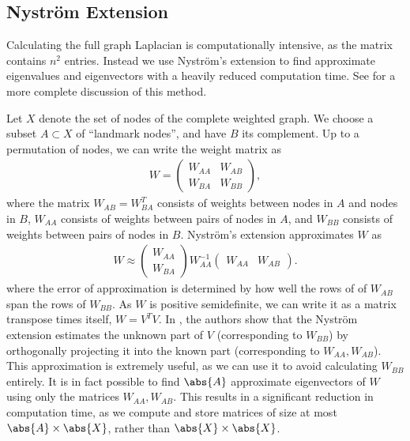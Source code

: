 \documentclass[journal]{IEEEtran}
\begin{document}
\subsection{Nystr\"{o}m Extension}\label{sec:Nystrom}
Calculating the full graph Laplacian is computationally intensive, as the matrix
contains $n^2$ entries. Instead we use Nystr\"{o}m's extension to find
approximate eigenvalues and eigenvectors with a heavily reduced computation
time. See \cite{Fowlkes04, Merkurjev13, Woodworth13} for a more complete
discussion of this method.

Let $X$ denote the set of nodes of the complete weighted graph. We choose a
subset $A\subset X$ of ``landmark nodes'', and have $B$ its complement. Up to a
permutation of nodes, we can write the weight matrix as
\begin{align}
  W = \begin{pmatrix} W_{AA} & W_{AB} \\ W_{BA} & W_{BB}
  \end{pmatrix},
\end{align}
where the matrix $W_{AB} = W_{BA}^T$ consists of weights between nodes in $A$
and nodes in $B$, $W_{AA}$ consists of weights between pairs of nodes in $A$,
and $W_{BB}$ consists of weights between pairs of nodes in $B$. Nystr\"{o}m's
extension approximates $W$ as
\begin{align}
  W \approx \begin{pmatrix} W_{AA} \\ W_{BA} \end{pmatrix}
  W_{AA}^{-1} \begin{pmatrix} W_{AA} & W_{AB}\end{pmatrix}.
\end{align}
where the error of approximation is determined by how well the rows of of
$W_{AB}$ span the rows of $W_{BB}$. As $W$ is positive semidefinite, we can
write it as a matrix transpose times itself, $W = V^TV$. In \cite{Belongie2002},
the authors show that the Nystr\"{o}m extension estimates the unknown part of
$V$ (corresponding to $W_{BB}$) by orthogonally projecting it into the known
part (corresponding to $W_{AA},W_{AB}$).  This approximation is extremely
useful, as we can use it to avoid calculating $W_{BB}$ entirely. It is in fact
possible to find $\abs{A}$ approximate eigenvectors of $W$ using only the
matrices $W_{AA},W_{AB}$. This results in a significant reduction in computation
time, as we compute and store matrices of size at most $\abs{A}\times\abs{X}$,
rather than $\abs{X}\times\abs{X}$.
\end{document}
